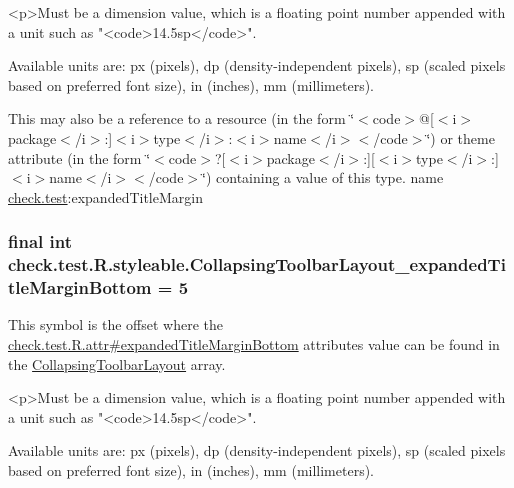 \begin{DoxyVerb}      <p>Must be a dimension value, which is a floating point number appended with a unit such as "<code>14.5sp</code>".
\end{DoxyVerb}
 Available units are\+: px (pixels), dp (density-\/independent pixels), sp (scaled pixels based on preferred font size), in (inches), mm (millimeters). 

This may also be a reference to a resource (in the form \char`\"{}$<$code$>$@\mbox{[}$<$i$>$package$<$/i$>$\+:\mbox{]}$<$i$>$type$<$/i$>$\+:$<$i$>$name$<$/i$>$$<$/code$>$\char`\"{}) or theme attribute (in the form \char`\"{}$<$code$>$?\mbox{[}$<$i$>$package$<$/i$>$\+:\mbox{]}\mbox{[}$<$i$>$type$<$/i$>$\+:\mbox{]}$<$i$>$name$<$/i$>$$<$/code$>$\char`\"{}) containing a value of this type.  name \hyperlink{namespacecheck_1_1test}{check.\+test}\+:expanded\+Title\+Margin \hypertarget{classcheck_1_1test_1_1_r_1_1styleable_afd2cccb26f6d0c7f231c62cd008c5963}{}
\subsubsection[{Collapsing\+Toolbar\+Layout\+\_\+expanded\+Title\+Margin\+Bottom}]{\setlength{\rightskip}{0pt plus 5cm}final int check.\+test.\+R.\+styleable.\+Collapsing\+Toolbar\+Layout\+\_\+expanded\+Title\+Margin\+Bottom = 5\hspace{0.3cm}{\ttfamily [static]}}\label{classcheck_1_1test_1_1_r_1_1styleable_afd2cccb26f6d0c7f231c62cd008c5963}
This symbol is the offset where the \hyperlink{classcheck_1_1test_1_1_r_1_1attr_aecfd01acd4ec8625740c74f45afd13a6}{check.\+test.\+R.\+attr\#expanded\+Title\+Margin\+Bottom} attribute\textquotesingle{}s value can be found in the \hyperlink{classcheck_1_1test_1_1_r_1_1styleable_a0c512120c75d0ddac20063034a72db17}{Collapsing\+Toolbar\+Layout} array.

\begin{DoxyVerb}      <p>Must be a dimension value, which is a floating point number appended with a unit such as "<code>14.5sp</code>".
\end{DoxyVerb}
 Available units are\+: px (pixels), dp (density-\/independent pixels), sp (scaled pixels based on preferred font size), in (inches), mm (millimeters). 

